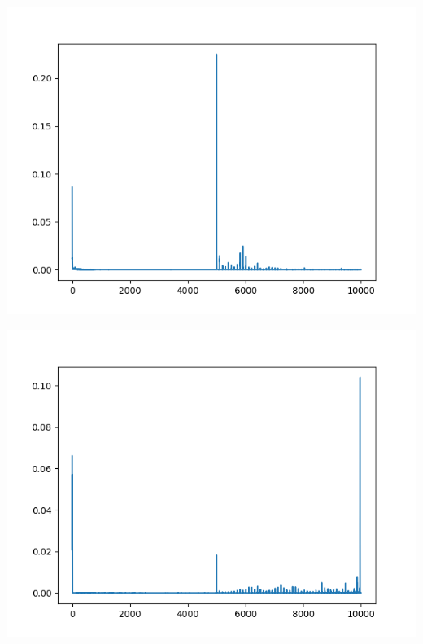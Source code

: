 \documentclass[a4paper, 12pt]{article}
\newenvironment{Figure}
  {\par\medskip\noindent\minipage{\linewidth}}
  {\endminipage\par\medskip}
\begin{document}
\begin{multicols}{2}
                \begin{Figure}
                    \centering
                    \includegraphics[width=\linewidth]{images/importance_1.png}
                    \label{alphafeat}
                \end{Figure}
                \begin{Figure}
                    \centering
                    \includegraphics[width=\linewidth]{images/importance_2.png}
                    \label{meshfeat}
                \end{Figure}
                \begin{Figure}

\end{Figure}
\end{multicols}
\end{document}
